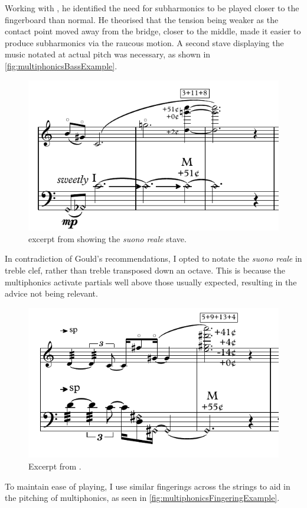 Working with \bassParticipant, he identified the need for subharmonics to be played closer to the fingerboard than normal.
He theorised that the tension being weaker as the contact point moved away from the bridge, closer to the middle, made it easier to produce subharmonics via the raucous motion.\autocite[]{bloggsFeedbackContrabassSession2019}
A second stave displaying the music notated at actual pitch was necessary, as shown in \autoref{fig:multiphonicsBassExample}.
\begin{figure}
  \centering
  \includegraphics{./resources/multiphonicsBassExample.pdf}
  \caption{excerpt from \bassPiece\space showing the \emph{suono reale} stave.}\label{fig:multiphonicsBassExample}
\end{figure}
In contradiction of Gould's recommendations, I opted to notate the \emph{suono reale} in treble clef, rather than treble transposed down an octave.\autocite[423]{gouldBars2011}
This is because the multiphonics activate partials well above those usually expected, resulting in the advice not being relevant.
\begin{figure}
  \centering
  \includegraphics{./resources/multiphonicsFingeringExample.pdf}
  \caption{Excerpt from \bassPiece.}\label{fig:multiphonicsFingeringExample}
\end{figure}
To maintain ease of playing, I use similar fingerings across the strings to aid in the pitching of multiphonics, as seen in \autoref{fig:multiphonicsFingeringExample}.





